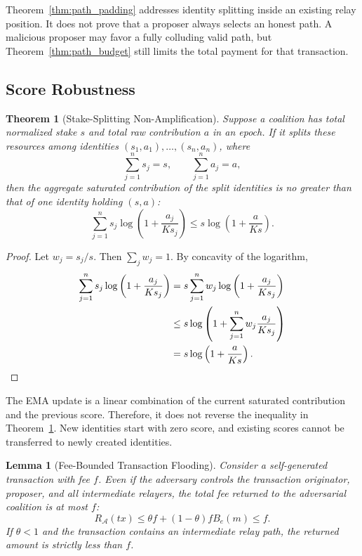 \documentclass[lettersize,journal]{IEEEtran}
\newtheorem{theorem}{Theorem}
\newtheorem{lemma}{Lemma}
\begin{document}
Theorem~\ref{thm:path_padding} addresses identity splitting inside an existing relay position.
It does not prove that a proposer always selects an honest path.
A malicious proposer may favor a fully colluding valid path, but Theorem~\ref{thm:path_budget} still limits the total payment for that transaction.


\subsection{Score Robustness}

\begin{theorem}[Stake-Splitting Non-Amplification]
\label{thm:stake_splitting}
Suppose a coalition has total normalized stake $s$ and total raw contribution $a$ in an epoch.
If it splits these resources among identities
$(s_1,a_1),\dots,(s_n,a_n)$, where
\begin{equation}
\sum_{j=1}^{n}s_j=s,
\qquad
\sum_{j=1}^{n}a_j=a,
\end{equation}
then the aggregate saturated contribution of the split identities is no greater than that of one identity holding $(s,a)$:
\begin{equation}
\sum_{j=1}^{n}
s_j
\log\left(
1+\frac{a_j}{Ks_j}
\right)
\leq
s
\log\left(
1+\frac{a}{Ks}
\right).
\end{equation}
\end{theorem}

\begin{proof}
Let $w_j=s_j/s$.
Then $\sum_j w_j=1$.
By concavity of the logarithm,
\begin{align}
\sum_{j=1}^{n}
s_j
\log\left(
1+\frac{a_j}{Ks_j}
\right)
&=
s\sum_{j=1}^{n}
w_j
\log\left(
1+\frac{a_j}{Ks_j}
\right) \notag\\
&\leq
s\log\left(
1+
\sum_{j=1}^{n}
w_j\frac{a_j}{Ks_j}
\right) \notag\\
&=
s\log\left(
1+\frac{a}{Ks}
\right).
\end{align}
\end{proof}

The EMA update is a linear combination of the current saturated contribution and the previous score.
Therefore, it does not reverse the inequality in Theorem~\ref{thm:stake_splitting}.
New identities start with zero score, and existing scores cannot be transferred to newly created identities.

\begin{lemma}[Fee-Bounded Transaction Flooding]
\label{lem:flooding}
Consider a self-generated transaction with fee $f$.
Even if the adversary controls the transaction originator, proposer, and all intermediate relayers, the total fee returned to the adversarial coalition is at most $f$:
\begin{equation}
R_{\mathcal{A}}(tx)
\leq
\theta f
+
(1-\theta)fB_e(m)
\leq
f.
\end{equation}
If $\theta<1$ and the transaction contains an intermediate relay path, the returned amount is strictly less than $f$.
\end{lemma}
\end{document}

